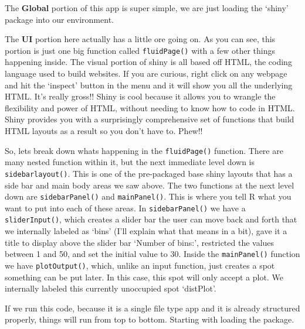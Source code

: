 \documentclass[
]{article}
\begin{document}
The \textbf{Global} portion of this app is super simple, we are just
loading the `shiny' package into our environment.

The \textbf{UI} portion here actually has a little ore going on. As you
can see, this portion is just one big function called
\texttt{fluidPage()} with a few other things happening inside. The
visual portion of shiny is all based off HTML, the coding language used
to build websites. If you are curious, right click on any webpage and
hit the `inspect' button in the menu and it will show you all the
underlying HTML. It's really gross!! Shiny is cool because it allows you
to wrangle the flexibility and power of HTML, without needing to know
how to code in HTML. Shiny provides you with a surprisingly
comprehensive set of functions that build HTML layouts as a result so
you don't have to. Phew!!

So, lets break down whats happening in the \texttt{fluidPage()}
function. There are many nested function within it, but the next
immediate level down is \texttt{sidebarlayout()}. This is one of the
pre-packaged base shiny layouts that has a side bar and main body areas
we saw above. The two functions at the next level down are
\texttt{sidebarPanel()} and \texttt{mainPanel()}. This is where you tell
R what you want to put into each of these areas. In
\texttt{sidebarPanel()} we have a \texttt{sliderInput()}, which creates
a slider bar the user can move back and forth that we internally labeled
as `bins' (I'll explain what that means in a bit), gave it a title to
display above the slider bar `Number of bins:', restricted the values
between 1 and 50, and set the initial value to 30. Inside the
\texttt{mainPanel()} function we have \texttt{plotOutput()}, which,
unlike an input function, just creates a spot something can be put
later. In this case, this spot will only accept a plot. We internally
labeled this currently unoccupied spot `distPlot'.

If we run this code, because it is a single file type app and it is
already structured properly, things will run from top to bottom.
Starting with loading the package.
\end{document}
